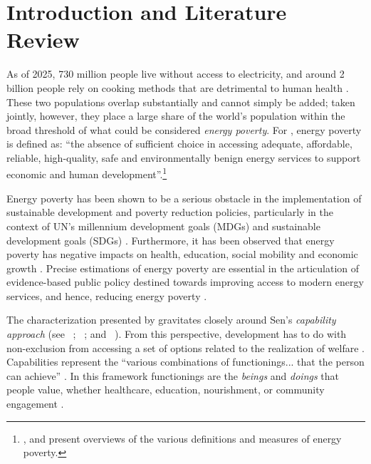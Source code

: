 \documentclass[11pt, a4paper]{article}
\newcommand{\citealp}[1]{\citeauthor{#1}~\citeyear{#1}}
\begin{document}
\thispagestyle{empty}

\clearpage
\newpage
\setcounter{page}{1}

\tableofcontents


\section{Introduction and Literature Review}

As of 2025, 730 million people live without access to electricity, and around 2 billion people rely on cooking methods that are detrimental to human health \parencite{zotero-item-1039}. These two populations overlap substantially and cannot simply be added; taken jointly, however, they place a large share of the world's population within the broad threshold of what could be considered \textit{energy poverty}. For \textcite[p. 44]{goldemberg2000}, energy poverty is defined as: ``the absence of sufficient choice in accessing adequate, affordable, reliable, high-quality, safe and environmentally benign energy services to support economic and human development''.\footnote{\textcite{bazilian2010}, \textcite{bouzarovski2015} and \textcite{day2016} present overviews of the various definitions and measures of energy poverty.} 

Energy poverty has been shown to be a serious obstacle in the implementation of sustainable development and poverty reduction policies, particularly in the context of UN's millennium development goals (MDGs) \parencite{zotero-item-1064}  and sustainable development goals (SDGs) \parencite{zotero-item-1065} \parencite{groh2014, jannuzzi2012, pachauri2012, zotero-item-1063, mccollum2018, santika2019, liu2022}. Furthermore, it has been observed that energy poverty has negative impacts on health, education, social mobility and economic growth \parencite{gonzalez-eguino2015, nadimi2017, nadimi2018, AFD_2025}. Precise estimations of energy poverty are essential in the articulation of evidence-based public policy destined towards improving access to modern energy services, and hence, reducing energy poverty \parencite{pelz2018, nussbaumer2012}. 

The characterization presented by \textcite{goldemberg2000} gravitates closely around Sen's \textit{capability approach} (see \citealp{sen2000a}; \citealp{sen2000}; and \citealp{sen2011}). From this perspective, development has to do with non-exclusion from accessing a set of options related to the realization of welfare \parencite{gonzalez-eguino2015}. Capabilities represent the ``various combinations of functionings... that the person can achieve'' \parencite[p. 40]{sen1995}. In this framework functionings are the \textit{beings} and \textit{doings} that people value, whether healthcare, education, nourishment, or community engagement \parencite{sen2011}.
\end{document}
